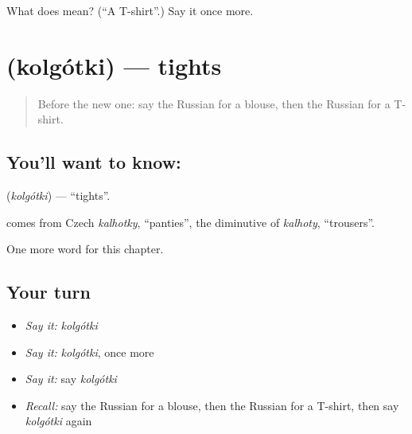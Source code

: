 \begin{tcolorbox}[breakable,colback=teal!4,colframe=teal!35!black,title={Before you move on}]
What does  mean? (\textquotedblleft{}A T-shirt\textquotedblright{}.) Say it once more.
\end{tcolorbox}
\section[\texorpdfstring{\ru{колготки} (kolgótki)}{колготки (kolgótki)}]{ (kolgótki) — tights}

\label{lesson:RU-C162-kolgotki}



\begin{quote}
Before the new one: say the Russian for a blouse, then the Russian for a T-shirt.
\end{quote}

\subsection*{You'll want to know: }
\textbf{} (\emph{kolgótki}) — \textquotedblleft{}tights\textquotedblright{}.

\begin{cousinweb}
\textbf{} comes from Czech \emph{kalhotky}, \textquotedblleft{}panties\textquotedblright{}, the diminutive of \emph{kalhoty}, \textquotedblleft{}trousers\textquotedblright{}.
\end{cousinweb}

\begin{grammarlens}[title={What you've built}]
One more word for this chapter.
\end{grammarlens}

\subsection*{Your turn}
\begin{itemize}
\raggedright
  \item \emph{Say it:} \emph{kolgótki}
  \item \emph{Say it:} \emph{kolgótki}, once more
  \item \emph{Say it:} say \emph{kolgótki}
  \item \emph{Recall:} say the Russian for a blouse, then the Russian for a T-shirt, then say \emph{kolgótki} again
\end{itemize}

